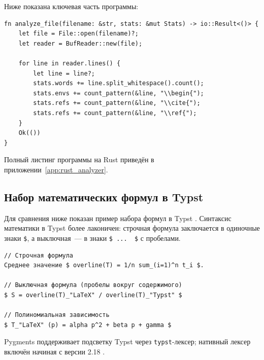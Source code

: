 Ниже показана ключевая часть программы:

\begin{verbatim}
fn analyze_file(filename: &str, stats: &mut Stats) -> io::Result<()> {
    let file = File::open(filename)?;
    let reader = BufReader::new(file);

    for line in reader.lines() {
        let line = line?;
        stats.words += line.split_whitespace().count();
        stats.envs += count_pattern(&line, "\\begin{");
        stats.refs += count_pattern(&line, "\\cite{");
        stats.refs += count_pattern(&line, "\\ref{");
    }
    Ok(())
}
\end{verbatim}

Полный листинг программы на Rust приведён в приложении~\ref{app:rust_analyzer}.

\subsection{Набор математических формул в Typst}

Для сравнения ниже показан пример набора формул в Typst \cite{typst-docs}. Синтаксис математики в Typst более лаконичен: строчная формула заключается в одиночные знаки \texttt{\$}, а выключная~--- в знаки \texttt{\$~...\,~\$} с пробелами.

\begin{verbatim}
// Строчная формула
Среднее значение $ overline(T) = 1/n sum_(i=1)^n t_i $.

// Выключная формула (пробелы вокруг содержимого)
$ S = overline(T)_"LaTeX" / overline(T)_"Typst" $

// Полиномиальная зависимость
$ T_"LaTeX" (p) = alpha p^2 + beta p + gamma $
\end{verbatim}

Pygments поддерживает подсветку Typst через \texttt{typst}-лексер; нативный лексер включён начиная с версии 2.18 \cite{pygments}.
